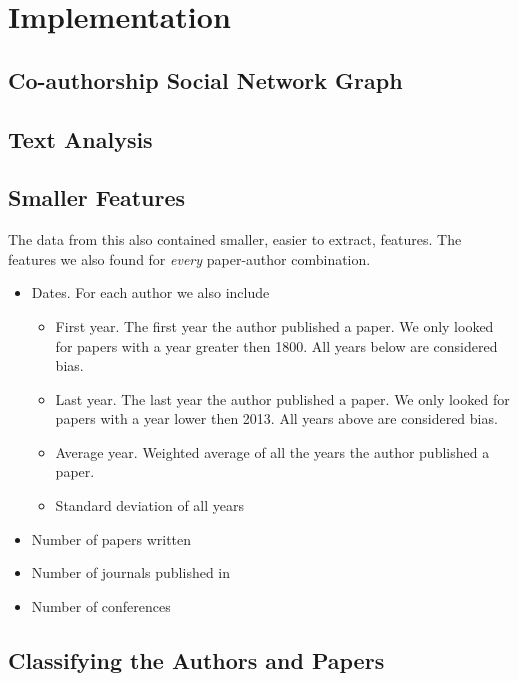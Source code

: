 \section{Implementation \label{sec:implementation}}

\subsection{Co-authorship Social Network Graph \label{sec:graph-implementation}}


\subsection{Text Analysis \label{sec:text-implementation}}



\subsection{Smaller Features \label{sec:smaller-features-implementation}}

The data from this also contained smaller, easier to extract, features. The features we also found for \textit{every} paper-author combination.

\begin{itemize}
\item[]Dates. For each author we also include
\begin{itemize}
\item[] First year. The first year the author published a paper. We only looked for papers with a year greater then 1800. All years below are considered bias.
\item[] Last year. The last year the author published a paper. We only looked for papers with a year lower then 2013. All years above are considered bias.
\item[] Average year. Weighted average of all the years the author published a paper.
\item[] Standard deviation of all years
\end{itemize}
\item[] Number of papers written
\item[] Number of journals published in 
\item[] Number of conferences
\end{itemize}


\subsection{Classifying the Authors and Papers \label{sec:classifier-implementation}}

